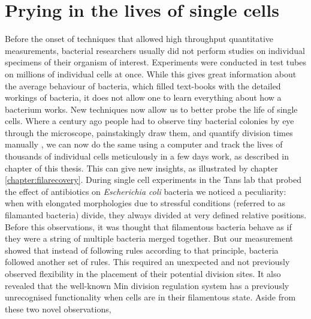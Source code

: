 \section{Prying in the lives of single cells}

%
%
Before the onset of techniques that allowed high throughput quantitative measurements, bacterial researchers usually did not perform studies on individual specimens of their organism of interest.
%
Experiments 
were conducted in test tubes on millions of individual cells at once.
%
While this gives great information about the average behaviour of bacteria, 
which filled text-books with the detailed workings of bacteria,
it does not allow one to learn everything about how a bacterium works.
%
%
New techniques now allow us to better probe the life of single cells.
%
Where a century ago people had to observe tiny bacterial colonies by eye through the microscope, painstakingly draw them, and quantify division times manually \cite{Kelly1932},
we can now do the same using a computer and 
track the lives of thousands of individual cells meticulously in a few days work, as described in chapter \cite{chapter:methods} of this thesis.
%
This can give new insights, as illustrated by chapter \ref{chapter:filarecovery}.
%
During single cell experiments in the Tans lab that probed the effect of antibiotics on \textit{Escherichia coli} bacteria \cite{RozendaalVerslagXXX} we noticed a peculiarity:
when \ecoli with elongated morphologies due to stressful conditions (referred to as filamanted bacteria) divide, 
they always divided at very defined relative positions.
%
Before this observations, it was thought that filamentous bacteria behave as if they were a string of multiple bacteria merged together.
%
But our measurement showed that instead of following rules according to that principle, 
bacteria followed another set of rules.
%
This required an unexpected and not previously observed flexibility in the placement of their potential division sites.
It also revealed that the well-known Min division regulation system has a previously unrecognised functionality when cells are in their filamentous state.
%
Aside from these two novel observations, 
